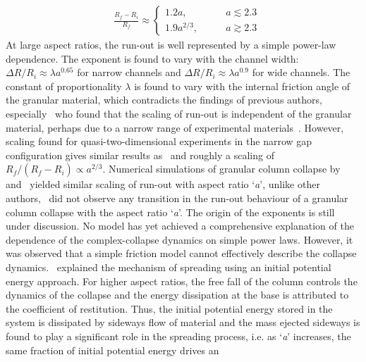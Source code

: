 \begin{align}
& \frac{\textit{R}_{\textit{f}}- 
\textit{R}_{\textit{i}}}{\textit{R}_{\textit{f}}} \approx
\begin{cases} 
1.2\textit{a}, \qquad &\textit{a} \lesssim 2.3 \\
1.9\textit{a}^{2/3}, \qquad &\textit{a} \gtrsim 2.3
\end{cases}
\end{align} 
At large aspect ratios, the run-out is well represented by a simple power-law 
dependence. The exponent is found to vary with the channel width: $\Delta 
\textit{R}/\textit{R}_{\textit{i}} \approx \lambda \textit{a}^{0.65}$ for 
narrow channels and $\Delta \textit{R}/\textit{R}_{\textit{i}} \approx \lambda 
\textit{a}^{0.9}$ for wide channels. The constant of proportionality $\lambda$ 
is found to vary with the internal friction angle of the granular material, 
which contradicts the findings of previous authors, especially~\citet{Lube2005} 
who found that the scaling of run-out is independent of the granular material, 
perhaps due to a narrow range of experimental materials~\citep{Staron2005}. 
However, scaling found for quasi-two-dimensional experiments in the narrow gap 
configuration gives similar results as~\citep{Lube2005} and roughly a scaling 
of $\textit{R}_{\textit{f}}/({\textit{R}_{\textit{f}} - 
\textit{R}_{\textit{i}}}) \propto \textit{a}^{2/3}$. Numerical simulations of 
granular column collapse by~\citet{Zenit2005} and~\citet{Staron2005} yielded 
similar scaling of run-out with aspect ratio `\textit{a}', unlike other 
authors,~\citet{Zenit2005} did not observe any transition in the run-out 
behaviour of a granular column collapse with the aspect ratio `\textit{a}'. The 
origin of the exponents is still under discussion. No model has yet achieved a 
comprehensive explanation of the dependence of the complex-collapse dynamics on 
simple power laws. However, it was observed that a simple friction model cannot 
effectively describe the collapse dynamics.~\citet{Staron2005} explained the 
mechanism of spreading using an initial potential energy approach. For higher 
aspect ratios, the free fall of the column controls the dynamics of the 
collapse and the energy dissipation at the base is attributed to the 
coefficient of restitution. Thus, the initial potential energy stored in the 
system is dissipated by sideways flow of material and the mass ejected sideways 
is found to play a significant role in the spreading process, i.e. as 
`\textit{a}' increases, the same fraction of initial potential energy drives an 
